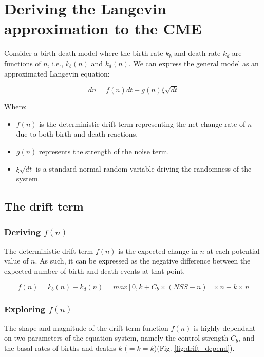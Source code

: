 \documentclass[]{article}
\begin{document}
\section{Deriving the Langevin approximation to the CME}

Consider a birth-death model where the birth rate \( k_b \) and death rate \( k_d \) are functions of \( n \), i.e., \( k_b(n) \) and \( k_d(n) \). We can express the general model as an approximated Langevin equation:

\begin{equation}
	dn = f(n) dt + g(n) \xi \sqrt{dt}
\end{equation}

Where:
\begin{itemize}
	\item \( f(n) \) is the deterministic drift term representing the net change rate of \( n \) due to both birth and death reactions.
	\item \( g(n) \) represents the strength of the noise term.
	\item \(\xi \sqrt{dt}\) is a standard normal random variable driving the randomness of the system.
\end{itemize}

\subsection{The drift term}

\subsubsection{Deriving $f(n)$}

The deterministic drift term $f(n)$ is the expected change in $n$ at each potential value of $n$. As such, it can be expressed as the negative difference between the expected number of birth and death events at that point. 

\begin{equation} \label{eq:term_drift} 
	f(n) = k_b(n) - k_d(n) = max[0, k + C_b \times (NSS-n)] \times n - k \times n
\end{equation}

\subsubsection{Exploring $f(n)$}

The shape and magnitude of the drift term function $f(n)$ is highly dependant on two parameters of the equation system, namely the control strength $C_b$, and the basal rates of births and deaths $k$ $( = k = k$)(Fig. \ref{fig:drift_depend}).
\end{document}
